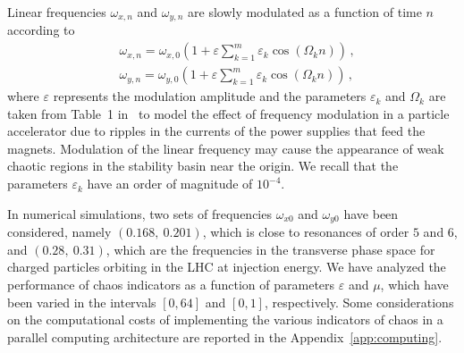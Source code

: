 Linear frequencies $\omega_{x, n}$ and $\omega_{y, n}$ are slowly modulated as a function of time $n$ according to
\begin{equation}
    \begin{aligned}
    &\omega_{x, n}=\omega_{x, 0}\left(1+\varepsilon \sum_{k=1}^{m} \varepsilon_{k} \cos \left(\Omega_{k} n\right)\right) \,, \\
    &\omega_{y, n}=\omega_{y, 0}\left(1+\varepsilon \sum_{k=1}^{m} \varepsilon_{k} \cos \left(\Omega_{k} n\right)\right) \,,
    \end{aligned}
\end{equation}
where $\varepsilon$ represents the modulation amplitude and the parameters $\varepsilon_k$ and $\Omega_k$ are taken from Table~1 in~\cite{invlog} to model the effect of frequency modulation in a particle accelerator due to ripples in the currents of the power supplies that feed the magnets. Modulation of the linear frequency may cause the appearance of weak chaotic regions in the stability basin near the origin. 
We recall that the parameters $\varepsilon_k$ have an order of magnitude of $10^{-4}$.

In numerical simulations, two sets of frequencies $\omega_{x0}$ and $\omega_{y0}$ have been considered, namely $(0.168,\ 0.201)$, which is close to resonances of order $5$ and $6$, and $(0.28,\ 0.31)$, which are the frequencies in the transverse phase space for charged particles orbiting in the LHC at injection energy.
We have analyzed the performance of chaos indicators as a function of parameters $\varepsilon$ and $\mu$, which have been varied in the intervals $[0,64]$ and $[0,1]$, respectively. Some considerations on the computational costs of implementing the various indicators of chaos in a parallel computing architecture are reported in the Appendix~\ref{app:computing}. 


